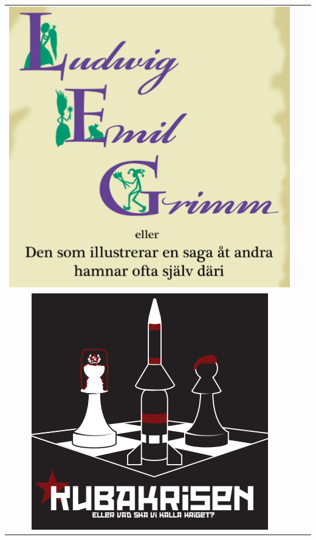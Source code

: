\begin{tabular}{c c c}
\includegraphics[width=\gamlaAffischerLength]{Bilder/TidigareSpexloggor/LudwigIcon} \\
\includegraphics[width=\gamlaAffischerLength]{Bilder/TidigareSpexloggor/KubaIcon}&

\end{tabular}
